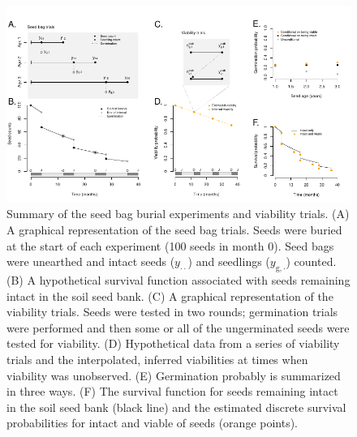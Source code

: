 \documentclass[12pt, oneside, titlepage]{article}   	%
\begin{document}
{\begin{figure}[t]
       \includegraphics[width=\textwidth]{../manuscript/figures/seed-bag-figure.pdf}  
    \caption{ Summary of the seed bag burial experiments and viability trials. (A) A graphical representation of the seed bag trials. Seeds were buried at the start of each experiment (100 seeds in month $0$). Seed bags were unearthed and intact seeds ($y_{\cdot \cdot}$) and seedlings ($y_{\mathrm{g},\cdot}$) counted. (B) A hypothetical survival function associated with seeds remaining intact in the soil seed bank. (C) A graphical representation of the viability trials. Seeds were tested in two rounds; germination trials were performed and then some or all of the ungerminated seeds were tested for viability. (D) Hypothetical data from a series of viability trials and the interpolated, inferred viabilities at times when viability was unobserved. (E) Germination probably is summarized in three ways. (F) The survival function for seeds remaining intact in the soil seed bank (black line) and the estimated discrete survival probabilities for intact and viable of seeds (orange points). }
 \label{fig:seed-bag-experiments}
\end{figure}

}
\end{document}
